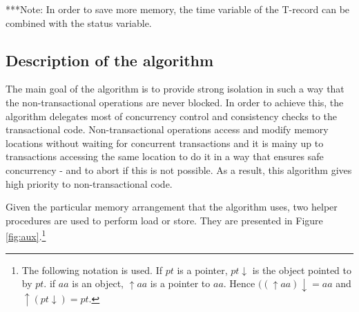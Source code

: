 \documentclass[11pt,letterpaper]{article}
\begin{document}
***Note: In order to save more memory, the time variable of the T-record can be combined
with the status variable.


\subsection{Description of the algorithm}

The main goal of the algorithm is to provide strong isolation 
in such a way that  the non-transactional  operations are never blocked. 
In order  to achieve this,  the algorithm delegates most of  
concurrency   control   and  consistency   checks   to  the   transactional
code. Non-transactional  
operations access and modify  memory  locations without waiting for concurrent transactions
 and it is mainy up to transactions accessing the same location to
do it in a way that ensures safe  
concurrency - and to abort if this  is not possible.  As a
result, this algorithm gives high  priority   to non-transactional code. 

Given the particular memory arrangement  that the algorithm uses, two helper
procedures are used  to perform load  or store. They are
presented  in  Figure  \ref{fig:aux}.\footnote{The following  notation  is
used. If $pt$ is a pointer, $pt\downarrow$ is the object pointed to by $pt$. 
if $aa$ is an object, $\uparrow aa$ is a pointer to $aa$. Hence 
$((\uparrow aa)\downarrow =aa$ and $ \uparrow(pt \downarrow)=pt$.}


\begin{figure}[htb]
\end{figure}
\end{document}
